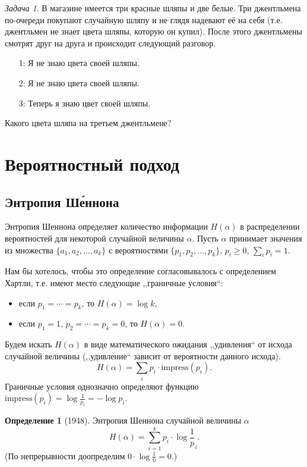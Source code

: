 \documentclass[12pt]{article}
\newcommand{\seqn}[2]{{#1}_1,{#1}_2,\dotsc,{#1}_{#2}}
\theoremstyle{definition}
\newtheorem{definition}{Определение}
\theoremstyle{plain}
\theoremstyle{remark}
\newtheorem{problem}{Задача}[section]
\begin{document}
\begin{problem}
    В магазине имеется три красные шляпы и две белые. Три джентльмена по-очереди покупают случайную шляпу и не глядя 
    надевают её на себя (т.е. джентльмен не знает цвета шляпы, которую он купил). После этого джентльмены смотрят друг
    на друга и происходит следующий разговор.
    \begin{itemize}
        \item[1:] Я не знаю цвета своей шляпы.
        \item[2:] Я не знаю цвета своей шляпы.
        \item[3:] Теперь я знаю цвет своей шляпы.
    \end{itemize}
    Какого цвета шляпа на третьем джентльмене?
\end{problem}


\section{Вероятностный подход}
\subsection{Энтропия Ш\'{е}ннона}

Энтропия Шеннона определяет количество информации \(H(\alpha)\) в распределении
вероятностей для некоторой случайной величины \(\alpha\).  Пусть \(\alpha\)
принимает значения из множества \(\{\seqn{a}{k}\}\) с вероятностями
\(\{\seqn{p}{k}\}\), \(p_i\ge 0 \), \(\sum_ip_i=1\).

Нам бы хотелось, чтобы это определение согласовывалось с определением Хартли, т.е. имеют место следующие ,,граничные условия``:
\begin{itemize}
\item если \(p_1=\dotsb=p_k\), то \(H(\alpha) = \log k\),
\item если \(p_1=1\), \(p_2=\dotsb=p_k=0\), то \(H(\alpha) = 0\).
\end{itemize}
Будем искать \(H(\alpha)\) в виде математического ожидания ,,удивления`` от исхода случайной величины (,,удивление`` зависит от вероятности данного исхода).
\[H(\alpha) = \sum_i p_i\cdot \mathrm{impress}(p_i).\]
Граничные условия однозначно определяют функцию \(\mathrm{impress}(p_i) = \log\frac{1}{p_i} = -\log p_i\).
\begin{definition}[1948]
Энтропия Шеннона случайной величины \(\alpha\) 
\[
H(\alpha) = \sum_{i=1}^k p_i\cdot\log\frac1p_i.
\]
(По непрерывности доопределим \(0\cdot \log\frac10 = 0\).)
\end{definition}
\end{document}
